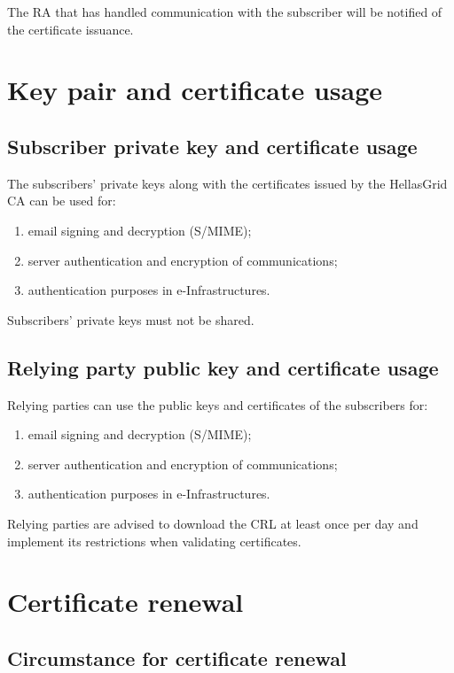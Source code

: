 The RA that has handled communication with the subscriber will be notified of the certificate issuance. 

\section{Key pair and certificate usage}
\subsection{Subscriber private key and certificate usage}

The subscribers' private keys along with the certificates issued by the HellasGrid CA can be used for:

\begin{enumerate}
\item{email signing and decryption (S/MIME);}
\item{server authentication and encryption of communications;}
\item{authentication purposes in e-Infrastructures.}
\end{enumerate}

Subscribers' private keys must not be shared.

\subsection{Relying party public key and certificate usage}

Relying parties can use the public keys and certificates of the subscribers for:

\begin{enumerate}
\item{email signing and decryption (S/MIME);}
\item{server authentication and encryption of communications;}
\item{authentication purposes in e-Infrastructures.}
\end{enumerate}

Relying parties are advised to download the CRL at least once per day and implement its restrictions when validating certificates.


\section{Certificate renewal}



\subsection{Circumstance for certificate renewal}

